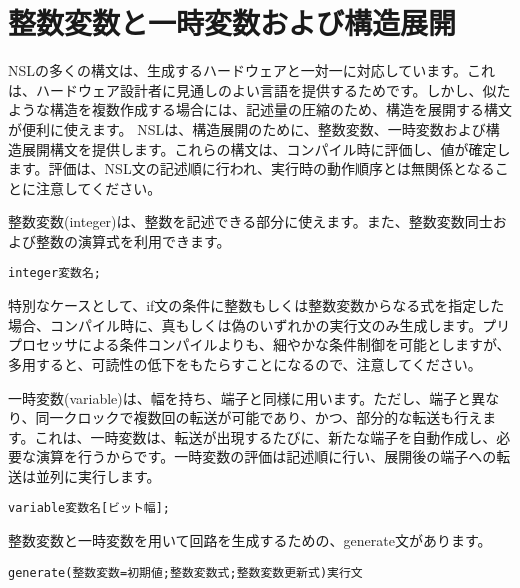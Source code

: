\chapter{整数変数と一時変数および構造展開}
\label{chap:integer}

NSLの多くの構文は、生成するハードウェアと一対一に対応しています。これは、ハードウェア設計者に見通しのよい言語を提供するためです。しかし、似たような構造を複数作成する場合には、記述量の圧縮のため、構造を展開する構文が便利に使えます。 NSLは、構造展開のために、整数変数、一時変数および構造展開構文を提供します。これらの構文は、コンパイル時に評価し、値が確定します。評価は、NSL文の記述順に行われ、実行時の動作順序とは無関係となることに注意してください。

整数変数(integer)は、整数を記述できる部分に使えます。また、整数変数同士および整数の演算式を利用できます。

\begin{reviewemlist}
\begin{alltt}
integer 変数名 ;
\end{alltt}
\end{reviewemlist}

特別なケースとして、if文の条件に整数もしくは整数変数からなる式を指定した場合、コンパイル時に、真もしくは偽のいずれかの実行文のみ生成します。プリプロセッサによる条件コンパイルよりも、細やかな条件制御を可能としますが、多用すると、可読性の低下をもたらすことになるので、注意してください。

一時変数(variable)は、幅を持ち、端子と同様に用います。ただし、端子と異なり、同一クロックで複数回の転送が可能であり、かつ、部分的な転送も行えます。これは、一時変数は、転送が出現するたびに、新たな端子を自動作成し、必要な演算を行うからです。一時変数の評価は記述順に行い、展開後の端子への転送は並列に実行します。

\begin{reviewemlist}
\begin{alltt}
variable 変数名[ビット幅] ;
\end{alltt}
\end{reviewemlist}

整数変数と一時変数を用いて回路を生成するための、generate文があります。

\begin{reviewemlist}
\begin{alltt}
generate(整数変数=初期値 ; 整数変数式 ; 整数変数更新式 ) 実行文
\end{alltt}
\end{reviewemlist}

